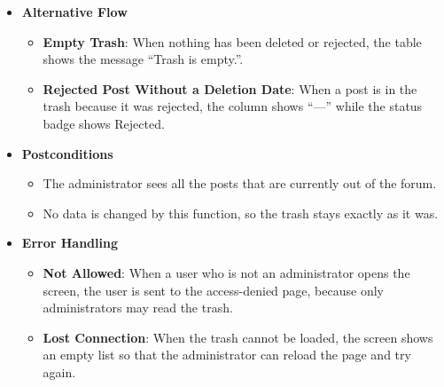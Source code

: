 \begin{itemize}[leftmargin=1.6em,topsep=4pt,itemsep=3pt,parsep=0pt,label=$\bullet$]
\begin{itemize}[leftmargin=2.2em,topsep=2pt,itemsep=3pt,parsep=0pt,label=$\circ$]
            \item \textbf{Switch to Comments}: The user presses the \textbf{Comments} tab at the top right of the screen to see the deleted comments instead (see \textbf{View Deleted Comment List}).
            \item \textbf{Move Between Pages}: When there is more than one page, the user uses the page numbers or the \textbf{Previous} and \textbf{Next} buttons at the bottom of the list.
            \item \textbf{Choose a Post}: The user opens a post with the view button, or restores it with the restore button in the row (see \textbf{View Deleted Post Detail} and \textbf{Restore Deleted Post}).
        \end{itemize}
    \item \textbf{Alternative Flow}
        \begin{itemize}[leftmargin=2.2em,topsep=2pt,itemsep=3pt,parsep=0pt,label=$\circ$]
            \item \textbf{Empty Trash}: When nothing has been deleted or rejected, the table shows the message ``Trash is empty.''.
            \item \textbf{Rejected Post Without a Deletion Date}: When a post is in the trash because it was rejected, the column shows ``---'' while the status badge shows Rejected.
        \end{itemize}
    \item \textbf{Postconditions}
        \begin{itemize}[leftmargin=2.2em,topsep=2pt,itemsep=3pt,parsep=0pt,label=$\circ$]
            \item The administrator sees all the posts that are currently out of the forum.
            \item No data is changed by this function, so the trash stays exactly as it was.
        \end{itemize}
    \item \textbf{Error Handling}
        \begin{itemize}[leftmargin=2.2em,topsep=2pt,itemsep=3pt,parsep=0pt,label=$\circ$]
            \item \textbf{Not Allowed}: When a user who is not an administrator opens the screen, the user is sent to the access-denied page, because only administrators may read the trash.
            \item \textbf{Lost Connection}: When the trash cannot be loaded, the screen shows an empty list so that the administrator can reload the page and try again.

\end{itemize}
\end{itemize}
